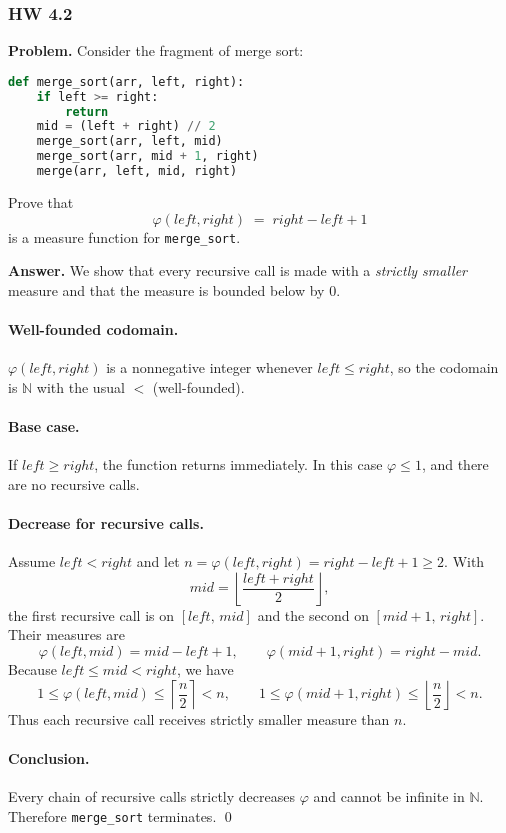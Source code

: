 \documentclass{article}
\theoremstyle{theorem}
\theoremstyle{definition}
\theoremstyle{remark}
\begin{document}
\subsubsection*{HW 4.2}
\textbf{Problem.} Consider the fragment of merge sort:
\begin{lstlisting}[language=Python]
def merge_sort(arr, left, right):
    if left >= right:
        return
    mid = (left + right) // 2
    merge_sort(arr, left, mid)
    merge_sort(arr, mid + 1, right)
    merge(arr, left, mid, right)
\end{lstlisting}
Prove that
\[
\varphi(left,right) \;=\; right - left + 1
\]
is a measure function for \texttt{merge\_sort}.

\medskip
\textbf{Answer.}
We show that every recursive call is made with a \emph{strictly smaller} measure and that the measure is bounded below by $0$.

\paragraph{Well-founded codomain.}
$\varphi(left,right)$ is a nonnegative integer whenever $left\le right$, so the codomain is $\mathbb{N}$ with the usual $<$ (well-founded).

\paragraph{Base case.}
If $left \ge right$, the function returns immediately. In this case $\varphi \le 1$, and there are no recursive calls.

\paragraph{Decrease for recursive calls.}
Assume $left < right$ and let $n = \varphi(left,right) = right-left+1 \ge 2$. With
\[
mid = \left\lfloor \frac{left+right}{2} \right\rfloor,
\]
the first recursive call is on $[left,\,mid]$ and the second on $[mid+1,\,right]$. Their measures are
\[
\varphi(left,mid) = mid - left + 1, \qquad
\varphi(mid+1,right) = right - mid.
\]
Because $left \le mid < right$, we have
\[
1 \le \varphi(left,mid) \le \left\lceil \frac{n}{2}\right\rceil < n,\qquad
1 \le \varphi(mid+1,right) \le \left\lfloor \frac{n}{2}\right\rfloor < n.
\]
Thus each recursive call receives strictly smaller measure than $n$.

\paragraph{Conclusion.}
Every chain of recursive calls strictly decreases $\varphi$ and cannot be infinite in $\mathbb{N}$. Therefore \texttt{merge\_sort} terminates. \qed
\end{document}
